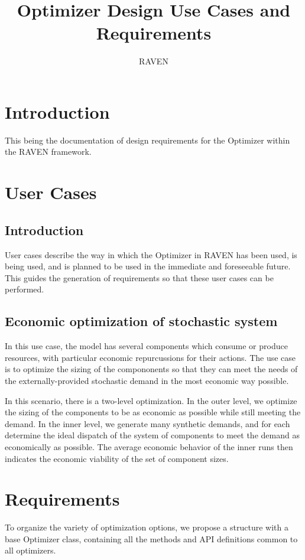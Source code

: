 \documentclass[11pt]{article}
\begin{document}
\title{Optimizer Design Use Cases and Requirements}

\author[]{RAVEN}
\renewcommand\Authands{ and }
\maketitle
\newpage
\section{Introduction}
This being the documentation of design requirements for the Optimizer within the RAVEN framework.

\section{User Cases}
\subsection{Introduction}
User cases describe the way in which the Optimizer in RAVEN has been used, is being used, and is
planned to be used in the immediate and foreseeable future. This guides the generation of
requirements so that these user cases can be performed.

\subsection{Economic optimization of stochastic system}
In this use case, the model has several components which consume or produce resources, with
particular economic repurcussions for their actions. The use case is to optimize the sizing of the
compononents so that they can meet the needs of the externally-provided stochastic demand in the
most economic way possible.

In this scenario, there is a two-level optimization. In the outer level, we optimize the sizing of
the components to be as economic as possible while still meeting the demand. In the inner level, we
generate many synthetic demands, and for each determine the ideal dispatch of the system of
components to meet the demand as economically as possible. The average economic behavior of the
inner runs then indicates the economic viability of the set of component sizes.

\section{Requirements}
To organize the variety of optimization options, we propose a structure with a base Optimizer class,
containing all the methods and API definitions common to all optimizers.
\end{document}
